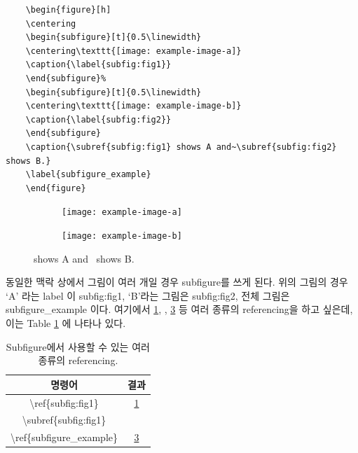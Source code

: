 \documentclass[twoside,11pt]{gshs_thesis}
\begin{document}
\begin{lstlisting}
	\begin{figure}[h]
	\centering
	\begin{subfigure}[t]{0.5\linewidth}
	\centering\texttt{[image: example-image-a]}
	\caption{\label{subfig:fig1}}
	\end{subfigure}%
	\begin{subfigure}[t]{0.5\linewidth}
	\centering\texttt{[image: example-image-b]}
	\caption{\label{subfig:fig2}}
	\end{subfigure}
	\caption{\subref{subfig:fig1} shows A and~\subref{subfig:fig2} shows B.}
	\label{subfigure_example}
	\end{figure}
\end{lstlisting}
\begin{figure}[h]
	\centering
	\begin{subfigure}[t]{0.5\linewidth}
		\centering\texttt{[image: example-image-a]}
		\caption{\label{subfig:fig1}}
	\end{subfigure}%
	\begin{subfigure}[t]{0.5\linewidth}
		\centering\texttt{[image: example-image-b]}
		\caption{\label{subfig:fig2}}
	\end{subfigure}
	\caption{ shows A and~ shows B.}
	\label{subfigure_example}
\end{figure}

동일한 맥락 상에서 그림이 여러 개일 경우 subfigure를 쓰게 된다. 위의 그림의 경우 `A' 라는 label 이 subfig:fig1, `B'라는 그림은 subfig:fig2, 전체 그림은 subfigure\_example 이다. 여기에서 \ref{subfig:fig1}, , \ref{subfigure_example} 등 여러 종류의 referencing을 하고 싶은데, 이는 Table \ref{table_subfigure_ref} 에 나타나 있다. 
\begin{table}[h]
	\caption{Subfigure에서 사용할 수 있는 여러 종류의 referencing.}
	\label{table_subfigure_ref}
	\begin{center}
		\begin{tabular}{|c|c|}
			\hline
			명령어 & 결과 \\
			\hline
			\textbackslash ref\{subfig:fig1\} & \ref{subfig:fig1} \\
			\hline
			\textbackslash subref\{subfig:fig1\} & \subref{subfig:fig1} \\
			\hline
			\textbackslash ref\{subfigure\_example\} & \ref{subfigure_example} \\
			\hline
		\end{tabular}
	\end{center}
\end{table}
\end{document}
